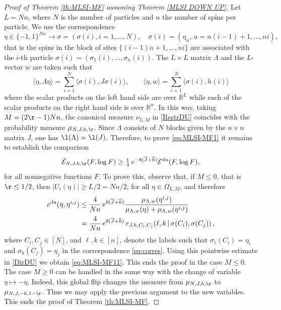 \documentclass[11pt,reqno]{amsart}
\numberwithin{equation}{section}
\numberwithin{figure}{section}
\newcommand{\1}{\mathds{1}}
\newcommand{\tc}{\,|\,}
\let\si=\sigma
\let\O=\Omega
\let\L=\Lambda
\newcommand{\bbR}{{\ensuremath{\mathbb R}} }
\begin{document}
\begin{proof}[Proof of Theorem \ref{th:MLSI-MF} assuming Theorem \ref{MLSI DOWN UP}]
Let \(L = Nn\), where \(N\) is the number of particles and \(n\) the number of spins per particle. We use the correspondence
\begin{equation}\label{eq:corres}
\eta \in \{-1,1\}^{Nn} \longrightarrow \sigma = (\sigma(i), i = 1, \dots, N), \quad \sigma(i) = (\eta_u, \,u = n(i-1)+1, \dots, ni),
\end{equation}
that is the spins in the block of sites \(\{(i-1)n+1,\dots,ni\}\) are associated with the $i$-th particle \(\si(i)=(\si_1(i),\dots,\si_n(i))\). 
The $L\times L$ matrix $\L$ and the $L$-vector $w$ are taken such that  
\begin{equation}\label{def JN}
    \langle \eta, \L \eta \rangle = \textstyle{\sum_{i=1}^N} \langle \si(i), J \si(i) \rangle, \qquad  \langle \eta, w \rangle = \textstyle{\sum_{i=1}^N}\langle \si(i), h (i)\rangle
\end{equation}
where the scalar products on the left hand side are over $\bbR^L$ while each of the scalar products on the right hand side is over $\bbR^n$. In this way, taking $M=(2\r-1)Nn$, the canonical measure $\nu_{L,M}$ in \eqref{RestrDU} coincides with the probability measure $\mu_{N,J,h,\r}$. Since $\L$ consists of $N$ blocks given by the $n\times n$ matrix $J$, one has $\l(\L)=\l(J)$.  
Therefore, to prove \eqref{eq:MLSI-MF1} it remains to establish the comparison
\begin{equation}\label{eq:MLSI-MF11}
\bar{\mathcal{E}}_{N, J,h,\r}(F, \log F) \ge \tfrac14\,e^{-8(\overline{J}+\overline{h})}\mathcal{E}^{\rm du}(F, \log F),
\end{equation}
for all nonnegative functions $F$. To prove this, observe that, if $M\le 0$, that is $\r\le1/2$, then $|U_i(\eta)|\ge L/2=Nn/2$, for all $\eta\in\O_{L,M}$, and therefore
\begin{align}\label{RatesDU2}
c^{\rm du}(\eta,\eta^{i,j}) &\le \frac4{Nn}\,e^{8(\overline{J}+\overline{h})}\frac{\mu_{\L,w}(\eta^{i,j})}{\mu_{\L,w}(\eta)+\mu_{\L,w}(\eta^{i,j})}\nonumber\\
&
=  \frac4{Nn}\,e^{8(\overline{J}+\overline{h})}\,r_{J,h,C_i,C_j}(\ell,k\tc\si(C_i),\si(C_j))\,,
\end{align}
where $C_i,C_j\in[N]$, and $\ell,k\in[n]$,  denote the labels such that $\si_\ell(C_i)=\eta_i$ and $\si_k(C_j)=\eta_j$ in the correspondence \eqref{eq:corres}. Using this pointwise estimate in \eqref{DirDU} we obtain \eqref{eq:MLSI-MF11}. %
This ends the proof in the case $M\le 0$. The case $M\ge 0$ can be handled in the same way with the change of variable $\eta\mapsto -\eta$. Indeed, this global flip changes the measure from $\mu_{N,J,h,\r}$ to $\mu_{N,J,-h,1-\r}$. Thus we may apply the previous argument to the new variables.
This ends the proof of Theorem \ref{th:MLSI-MF}.
\end{proof}
\end{document}
